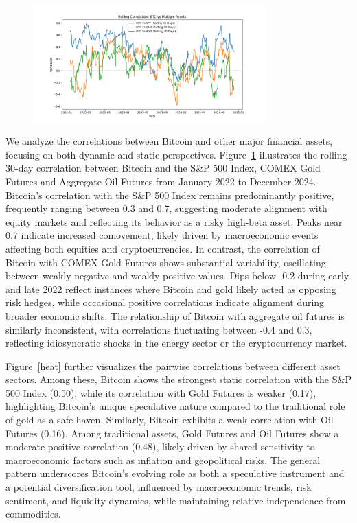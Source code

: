 \documentclass{article}
\begin{document}
\begin{figure}[h!]
    \centering
    \includegraphics[width=0.8\textwidth]{figures/rolling_correlation_multi.png}
    \caption{}
    \label{volatility}
    
\end{figure}


We analyze the correlations between Bitcoin and other major financial assets, focusing on both dynamic and static perspectives. Figure~\ref{volatility} illustrates the rolling 30-day correlation between Bitcoin and the S\&P 500 Index, COMEX Gold Futures and Aggregate Oil Futures from January 2022 to December 2024. Bitcoin’s correlation with the S\&P 500 Index remains predominantly positive, frequently ranging between 0.3 and 0.7, suggesting moderate alignment with equity markets and reflecting its behavior as a risky high-beta asset. Peaks near 0.7 indicate increased comovement, likely driven by macroeconomic events affecting both equities and cryptocurrencies. In contrast, the correlation of Bitcoin with COMEX Gold Futures shows substantial variability, oscillating between weakly negative and weakly positive values. Dips below -0.2 during early and late 2022 reflect instances where Bitcoin and gold likely acted as opposing risk hedges, while occasional positive correlations indicate alignment during broader economic shifts. The relationship of Bitcoin with aggregate oil futures is similarly inconsistent, with correlations fluctuating between -0.4 and 0.3, reflecting idiosyncratic shocks in the energy sector or the cryptocurrency market.

Figure~\ref{heat} further visualizes the pairwise correlations between different asset sectors. Among these, Bitcoin shows the strongest static correlation with the S\&P 500 Index (0.50), while its correlation with Gold Futures is weaker (0.17), highlighting Bitcoin’s unique speculative nature compared to the traditional role of gold as a safe haven. Similarly, Bitcoin exhibits a weak correlation with Oil Futures (0.16). Among traditional assets, Gold Futures and Oil Futures show a moderate positive correlation (0.48), likely driven by shared sensitivity to macroeconomic factors such as inflation and geopolitical risks. The general pattern underscores Bitcoin’s evolving role as both a speculative instrument and a potential diversification tool, influenced by macroeconomic trends, risk sentiment, and liquidity dynamics, while maintaining relative independence from commodities.
\end{document}
